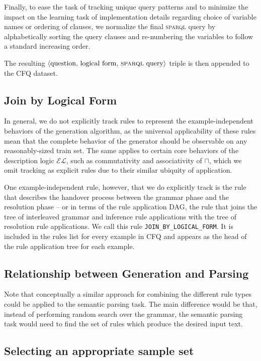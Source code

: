 \documentclass[letterpaper]{article}
\newcommand{\SPARQL}{\textsc{sparql}}
\begin{document}
Finally, to ease the task of tracking unique query patterns and to minimize the impact on the learning task of implementation details regarding choice of variable names or ordering of clauses, we normalize the final \SPARQL{} query by alphabetically sorting the query clauses and re-numbering the variables to follow a standard increasing order.

The resulting $\langle \text{question, logical form, \SPARQL{} query} \rangle$ triple is then appended to the CFQ dataset.

\subsection{Join by Logical Form}

In general, we do not explicitly track rules to represent the example-independent behaviors of the generation algorithm, as the universal applicability of these rules mean that the complete behavior of the generator should be observable on any reasonably-sized train set. The same applies to certain core behaviors of the description logic $\mathcal{EL}$, such as commutativity and associativity of $\sqcap$, which we omit tracking as explicit rules due to their similar ubiquity of application.

One example-independent rule, however, that we do explicitly track is the rule that describes the handover process between the grammar phase and the resolution phase -- or in terms of the rule application DAG, the rule that joins the tree of interleaved grammar and inference rule applications with the tree of resolution rule applications. We call this rule \texttt{JOIN\_BY\_LOGICAL\_FORM}. It is included in the rules list for every example in CFQ and appears as the head of the rule application tree for each example.

\subsection{Relationship between Generation and Parsing}

Note that conceptually a similar approach for combining the different rule types could be applied to the semantic parsing task. The main difference would be that, instead of performing random search over the grammar, the semantic parsing task would need to find the set of rules which produce the desired input text.

\subsection{Selecting an appropriate sample set}
\end{document}

